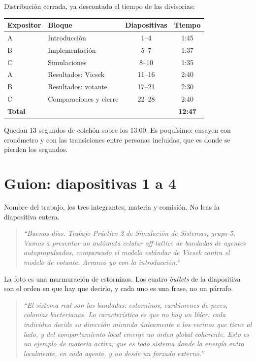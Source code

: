 \documentclass[11pt]{article}
\begin{document}
Distribución cerrada, ya descontado el tiempo de las divisorias:

\begin{center}
\begin{tabular}{llcc}
\toprule
Expositor & Bloque & Diapositivas & Tiempo \\
\midrule
A & Introducción            & 1--4   & 1:45 \\
B & Implementación          & 5--7   & 1:37 \\
C & Simulaciones            & 8--10  & 1:35 \\
A & Resultados: Vicsek      & 11--16 & 2:40 \\
B & Resultados: votante     & 17--21 & 2:30 \\
C & Comparaciones y cierre  & 22--28 & 2:40 \\
\midrule
\multicolumn{3}{l}{\textbf{Total}} & \textbf{12:47} \\
\bottomrule
\end{tabular}
\end{center}

Quedan 13 segundos de colchón sobre los 13:00. Es poquísimo: ensayen con
cronómetro y con las transiciones entre personas incluidas, que es donde se
pierden los segundos.

\section{Guion: diapositivas 1 a 4}


Nombre del trabajo, los tres integrantes, materia y comisión. No leas la
diapositiva entera.

\begin{quote}
\itshape
``Buenos días. Trabajo Práctico 2 de Simulación de Sistemas, grupo 5. Vamos a
presentar un autómata celular off-lattice de bandadas de agentes
autopropulsados, comparando el modelo estándar de Vicsek contra el modelo de
votante. Arranco yo con la introducción.''
\end{quote}


La foto es una murmuración de estorninos. Los cuatro \textit{bullets} de la
diapositiva son el orden en que hay que decirlo, y cada uno es una frase, no un
párrafo.

\begin{quote}
\itshape
``El sistema real son las bandadas: estorninos, cardúmenes de peces, colonias
bacterianas. Lo característico es que \emph{no hay un líder}: cada individuo
decide su dirección mirando únicamente a los vecinos que tiene al lado, y del
comportamiento local emerge un orden global coherente. Esto es un ejemplo de
materia activa, que es todo sistema donde la energía entra localmente, en cada
agente, y no desde un forzado externo.''
\end{quote}
\end{document}
